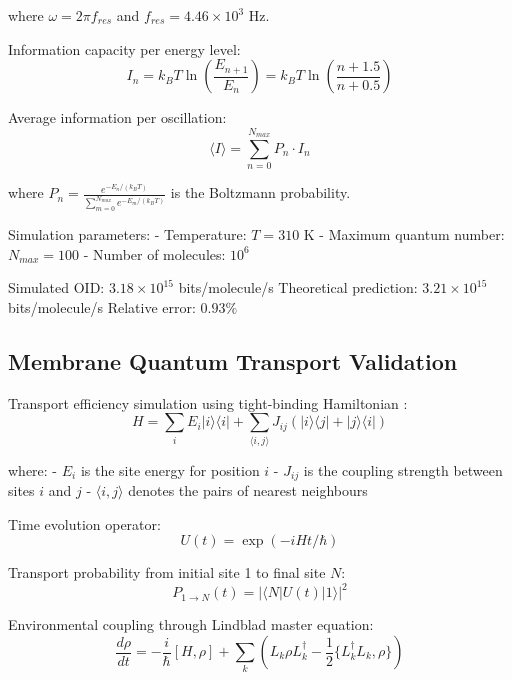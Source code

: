 \documentclass[12pt,a4paper]{article}
\begin{document}
where $\omega = 2\pi f_{res}$ and $f_{res} = 4.46 \times 10^3$ Hz.

Information capacity per energy level:
\begin{equation}
I_n = k_B T \ln\left(\frac{E_{n+1}}{E_n}\right) = k_B T \ln\left(\frac{n+1.5}{n+0.5}\right)
\end{equation}

Average information per oscillation:
\begin{equation}
\langle I \rangle = \sum_{n=0}^{N_{max}} P_n \cdot I_n
\end{equation}

where $P_n = \frac{e^{-E_n/(k_B T)}}{\sum_{m=0}^{N_{max}} e^{-E_m/(k_B T)}}$ is the Boltzmann probability.

Simulation parameters:
- Temperature: $T = 310$ K
- Maximum quantum number: $N_{max} = 100$
- Number of molecules: $10^6$

Simulated OID: $3.18 \times 10^{15}$ bits/molecule/s
Theoretical prediction: $3.21 \times 10^{15}$ bits/molecule/s
Relative error: $0.93\%$

\subsection{Membrane Quantum Transport Validation}

Transport efficiency simulation using tight-binding Hamiltonian \cite{ashcroft1976solid}:
\begin{equation}
H = \sum_i E_i |i\rangle\langle i| + \sum_{\langle i,j \rangle} J_{ij} (|i\rangle\langle j| + |j\rangle\langle i|)
\end{equation}

where:
- $E_i$ is the site energy for position $i$
- $J_{ij}$ is the coupling strength between sites $i$ and $j$
- $\langle i,j \rangle$ denotes the pairs of nearest neighbours

Time evolution operator:
\begin{equation}
U(t) = \exp\left(-i H t / \hbar\right)
\end{equation}

Transport probability from initial site 1 to final site $N$:
\begin{equation}
P_{1 \rightarrow N}(t) = |\langle N | U(t) | 1 \rangle|^2
\end{equation}

Environmental coupling through Lindblad master equation:
\begin{equation}
\frac{d\rho}{dt} = -\frac{i}{\hbar}[H, \rho] + \sum_k \left(L_k \rho L_k^\dagger - \frac{1}{2}\{L_k^\dagger L_k, \rho\}\right)
\end{equation}
\end{document}
